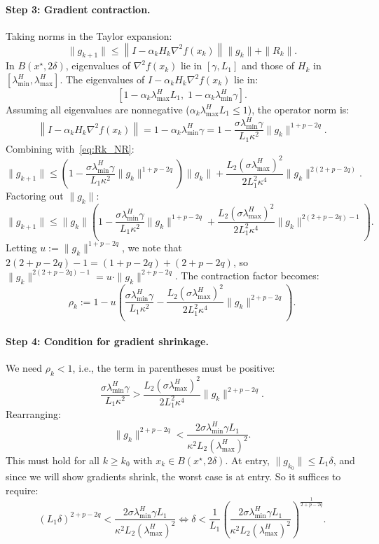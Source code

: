 \documentclass{article}
\begin{document}
\paragraph{Step 3: Gradient contraction.} Taking norms in the Taylor expansion:
\[
\|g_{k+1}\| \leq \left\|I - \alpha_k H_k \nabla^2 f(x_k)\right\|\|g_k\| + \|R_k\|.
\]
In $B(x^\star, 2\delta)$, eigenvalues of $\nabla^2 f(x_k)$ lie in $[\gamma, L_1]$ and those of $H_k$ in $[\lambda_{\min}^H, \lambda_{\max}^H]$. The eigenvalues of $I - \alpha_k H_k \nabla^2 f(x_k)$ lie in:
\[
\left[1 - \alpha_k\lambda_{\max}^H L_1,\; 1 - \alpha_k\lambda_{\min}^H\gamma\right].
\]
Assuming all eigenvalues are nonnegative ($\alpha_k\lambda_{\max}^H L_1 \leq 1$), the operator norm is:
\[
\left\|I - \alpha_k H_k \nabla^2 f(x_k)\right\| = 1 - \alpha_k\lambda_{\min}^H\gamma = 1 - \frac{\sigma\lambda_{\min}^H\gamma}{L_1\kappa^2}\|g_k\|^{1+p-2q}.
\]
Combining with~\eqref{eq:Rk_NR}:
\begin{equation}
\label{eq:grad_contraction_NR_full}
\|g_{k+1}\| \leq \left(1 - \frac{\sigma\lambda_{\min}^H\gamma}{L_1\kappa^2}\|g_k\|^{1+p-2q}\right)\|g_k\| + \frac{L_2(\sigma\lambda_{\max}^H)^2}{2L_1^2\kappa^4}\|g_k\|^{2(2+p-2q)}.
\end{equation}
Factoring out $\|g_k\|$:
\[
\|g_{k+1}\| \leq \|g_k\|\left(1 - \frac{\sigma\lambda_{\min}^H\gamma}{L_1\kappa^2}\|g_k\|^{1+p-2q} + \frac{L_2(\sigma\lambda_{\max}^H)^2}{2L_1^2\kappa^4}\|g_k\|^{2(2+p-2q)-1}\right).
\]
Letting $u := \|g_k\|^{1+p-2q}$, we note that $2(2+p-2q)-1 = (1+p-2q) + (2+p-2q)$, so $\|g_k\|^{2(2+p-2q)-1} = u \cdot \|g_k\|^{2+p-2q}$. The contraction factor becomes:
\begin{equation}
\label{eq:rho_k_NR}
\rho_k := 1 - u\left(\frac{\sigma\lambda_{\min}^H\gamma}{L_1\kappa^2} - \frac{L_2(\sigma\lambda_{\max}^H)^2}{2L_1^2\kappa^4}\|g_k\|^{2+p-2q}\right).
\end{equation}

\paragraph{Step 4: Condition for gradient shrinkage.} We need $\rho_k < 1$, i.e., the term in parentheses must be positive:
\[
\frac{\sigma\lambda_{\min}^H\gamma}{L_1\kappa^2} > \frac{L_2(\sigma\lambda_{\max}^H)^2}{2L_1^2\kappa^4}\|g_k\|^{2+p-2q}.
\]
Rearranging:
\[
\|g_k\|^{2+p-2q} < \frac{2\sigma\lambda_{\min}^H\gamma L_1}{\kappa^2 L_2(\lambda_{\max}^H)^2}.
\]
This must hold for all $k \geq k_0$ with $x_k \in B(x^\star, 2\delta)$. At entry, $\|g_{k_0}\| \leq L_1\delta$, and since we will show gradients shrink, the worst case is at entry. So it suffices to require:
\begin{equation}
\label{eq:delta_cond_NR_tight}
(L_1\delta)^{2+p-2q} < \frac{2\sigma\lambda_{\min}^H\gamma L_1}{\kappa^2 L_2(\lambda_{\max}^H)^2} \iff \delta < \frac{1}{L_1}\left(\frac{2\sigma\lambda_{\min}^H\gamma L_1}{\kappa^2 L_2(\lambda_{\max}^H)^2}\right)^{\frac{1}{2+p-2q}}.
\end{equation}
\end{document}
